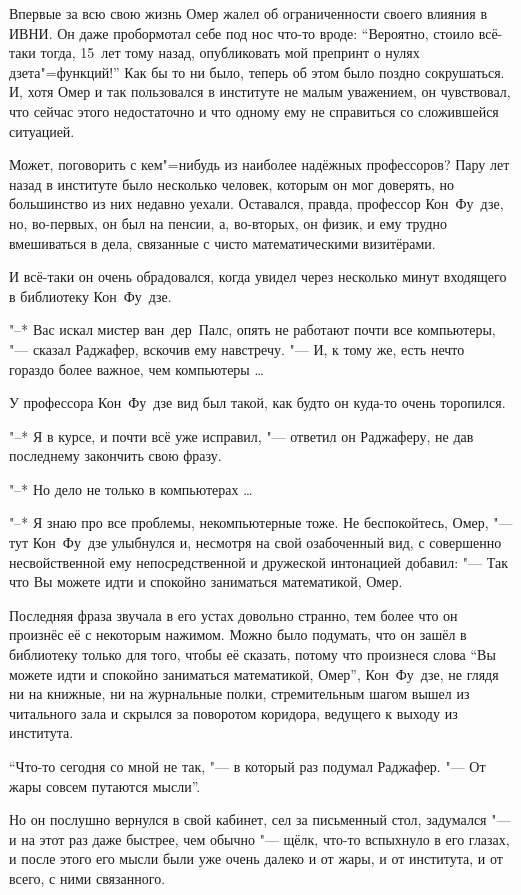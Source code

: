 Впервые за всю свою жизнь Омер жалел об ограниченности своего влияния в ИВНИ.
Он даже пробормотал себе под нос что-то вроде: \enquote{Вероятно, стоило всё-таки
тогда, 15~лет тому назад, опубликовать мой препринт о нулях дзета"=функций!}
Как бы то ни было, теперь об этом было поздно сокрушаться.
И, хотя Омер и так пользовался в институте не малым уважением, он чувствовал,
что сейчас этого недостаточно и что одному ему не справиться со сложившейся
ситуацией.

Может, поговорить с кем"=нибудь из наиболее надёжных профессоров?
Пару лет назад в институте было несколько человек, которым он мог доверять, но
большинство из них недавно уехали.
Оставался, правда, профессор Кон~Фу~дзе, но, во-первых, он был на пенсии, а,
во-вторых, он физик, и ему трудно вмешиваться в дела, связанные с чисто
математическими визитёрами.

И всё-таки он очень обрадовался, когда увидел через несколько минут входящего в
библиотеку Кон~Фу~дзе.

"--* Вас искал мистер ван~дер~Палс, опять не работают почти все компьютеры,
"--- сказал Раджафер, вскочив ему навстречу.
"--- И, к тому же, есть нечто гораздо более важное, чем компьютеры \ldots

У профессора Кон~Фу~дзе вид был такой, как будто он куда-то очень торопился.

"--* Я в курсе, и почти всё уже исправил, "--- ответил он Раджаферу, не дав
последнему закончить свою фразу.

"--* Но дело не только в компьютерах \ldots

"--* Я знаю про все проблемы, некомпьютерные тоже.
Не беспокойтесь, Омер, "--- тут Кон~Фу~дзе улыбнулся и, несмотря на свой
озабоченный вид, с совершенно несвойственной ему непосредственной и дружеской
интонацией добавил: "--- Так что Вы можете идти и спокойно заниматься
математикой, Омер.

Последняя фраза звучала в его устах довольно странно, тем более что он произнёс
её с некоторым нажимом. Можно было подумать, что он зашёл в библиотеку только
для того, чтобы её сказать, потому что произнеся слова \enquote{Вы можете идти и
спокойно заниматься математикой, Омер}, Кон~Фу~дзе, не глядя ни на книжные, ни
на журнальные полки, стремительным шагом вышел из читального зала и скрылся за
поворотом коридора, ведущего к выходу из института.

\enquote{Что-то сегодня со мной не так, "--- в который раз подумал Раджафер.
"--- От жары совсем путаются мысли}.

Но он послушно вернулся в свой кабинет, сел за письменный стол, задумался "---
и на этот раз даже быстрее, чем обычно "--- щёлк, что-то вспыхнуло в его глазах,
и после этого его мысли были уже очень далеко и от жары, и от института, и от
всего, с ними связанного.
